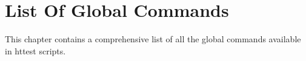 
\newpage
\chapter{List Of Global Commands}
\label{chap:globalCommandsList}

This chapter contains a comprehensive list of all the global 
commands available in httest scripts.
